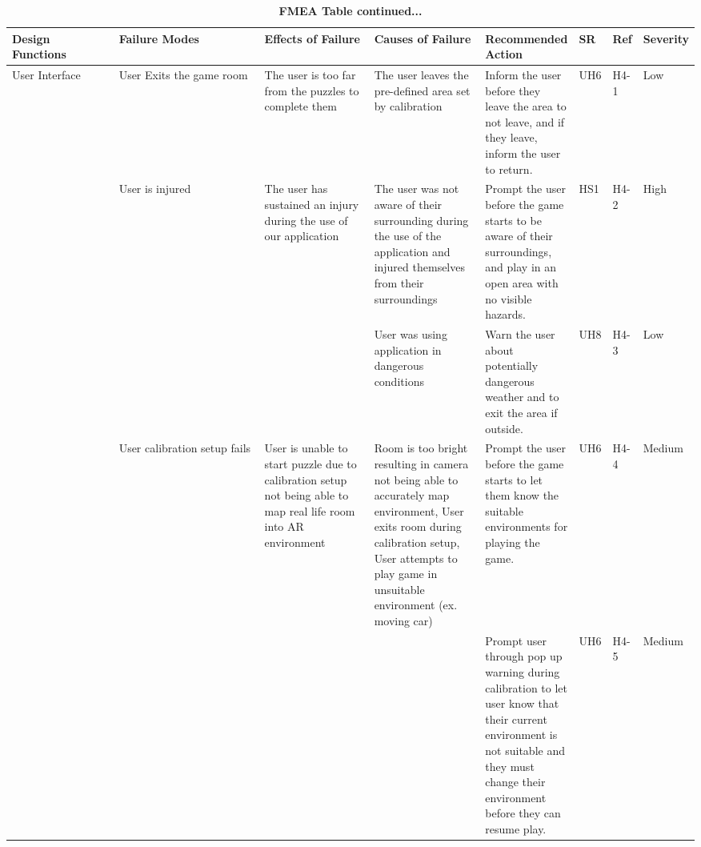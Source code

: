 \documentclass{article}
\begin{document}
\begin{table}[H]
    \begin{adjustbox}{width=(/5)}
    \centering
    

    \begin{tabular}{|p{0.20\linewidth} | p{0.30\linewidth} | p{0.20\linewidth}|  p{0.20\linewidth}|  p{0.30\linewidth}|  p{0.07\linewidth}|  p{0.07\linewidth}|p{0.12\linewidth}| }
    \hline
         \textbf{Design Functions} & \textbf{Failure Modes} & \textbf{Effects of Failure} & \textbf{Causes of Failure} & \textbf{Recommended Action} & \textbf{SR} & \textbf{Ref} & \textbf{Severity}\\
         \hline
          User Interface                   &           User Exits the game room             &           The user is too far from the puzzles to complete them           &                The user leaves the pre-defined area set by calibration            &           Inform the user before they leave the area to not leave, and if they leave, inform the user to return.                  &   UH6          &   H4-1           &   Low               \\
            &    User is injured     &    The user has sustained an injury during the use of our application      &  The user was not aware of their surrounding during the use of the application and injured themselves from their surroundings \newline                 &    Prompt the user before the game starts to be aware of their surroundings, and play in an open area with no visible hazards.    &  HS1           &   H4-2     & High\\&&& User was using application in dangerous conditions \newline & Warn the user about potentially dangerous weather and to exit the area if outside. &   UH8   &  H4-3 & Low                \\
                                   &    User calibration setup fails   &   User is unable to start puzzle due to calibration setup not being able to map real life room into AR environment & Room is too bright resulting in camera not being able to accurately map environment, User exits room during calibration setup, User attempts to play game in unsuitable environment (ex. moving car) & Prompt the user before the game starts to let them know the suitable environments for playing the game. &UH6&H4-4& Medium\\&&&& Prompt user through pop up warning during calibration to let user know that their current environment is not suitable and they must change their environment before they can resume play.   & UH6   & H4-5 & Medium   \\
          \hline
    \end{tabular}
    \end{adjustbox}
    \caption{\bf FMEA Table continued...}
    \label{tab:FMEA2}
\end{table}
\end{document}
